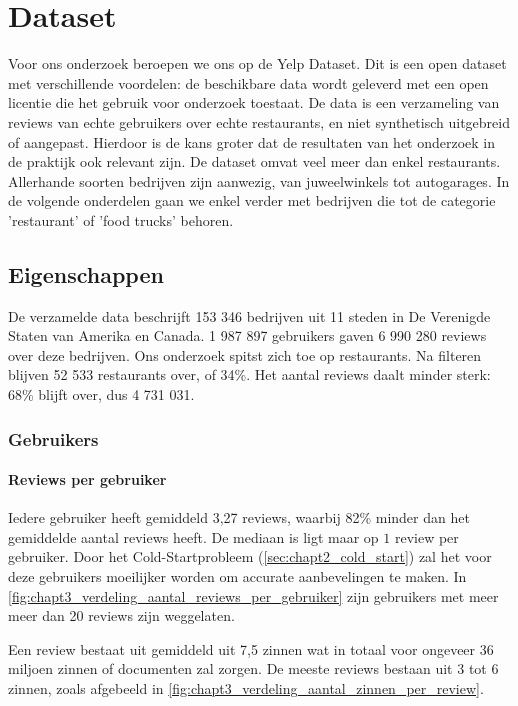 \chapter{Dataset}
\label{sec:chapt3}

Voor ons onderzoek beroepen we ons op de Yelp Dataset. Dit is een open dataset met verschillende voordelen: de beschikbare data wordt geleverd met een open licentie die het gebruik voor onderzoek toestaat. \cite{Yelp_Dataset} De data is een verzameling van reviews van echte gebruikers over echte restaurants, en niet synthetisch uitgebreid of aangepast. Hierdoor is de kans groter dat de resultaten van het onderzoek in de praktijk ook relevant zijn. De dataset omvat veel meer dan enkel restaurants. Allerhande soorten bedrijven zijn aanwezig, van juweelwinkels tot autogarages. In de volgende onderdelen gaan we enkel verder met bedrijven die tot de categorie 'restaurant' of 'food trucks' behoren. 

\section{Eigenschappen}
\label{sub:chapt3_eigenschappen_dataset}
De verzamelde data beschrijft 153 346 bedrijven uit 11 steden in De Verenigde Staten van Amerika en Canada. 1 987 897 gebruikers gaven 6 990 280 reviews over deze bedrijven. Ons onderzoek spitst zich toe op restaurants. Na filteren blijven 52 533 restaurants over, of 34\%. Het aantal reviews daalt minder sterk: 68\% blijft over, dus 4 731 031.

\subsection{Gebruikers}
\subsubsection{Reviews per gebruiker}
\label{sec:chapt3_reviews_per_gebruiker}
Iedere gebruiker heeft gemiddeld 3,27 reviews, waarbij 82\% minder dan het gemiddelde aantal reviews heeft. De mediaan is ligt maar op $1$ review per gebruiker. Door het Cold-Startprobleem (\ref{sec:chapt2_cold_start}) zal het voor deze gebruikers moeilijker worden om accurate aanbevelingen te maken. In \autoref{fig:chapt3_verdeling_aantal_reviews_per_gebruiker} zijn gebruikers met meer meer dan 20 reviews zijn weggelaten.

Een review bestaat uit gemiddeld uit 7,5 zinnen wat in totaal voor ongeveer 36 miljoen zinnen of documenten zal zorgen. De meeste reviews bestaan uit 3 tot 6 zinnen, zoals afgebeeld in \autoref{fig:chapt3_verdeling_aantal_zinnen_per_review}.

